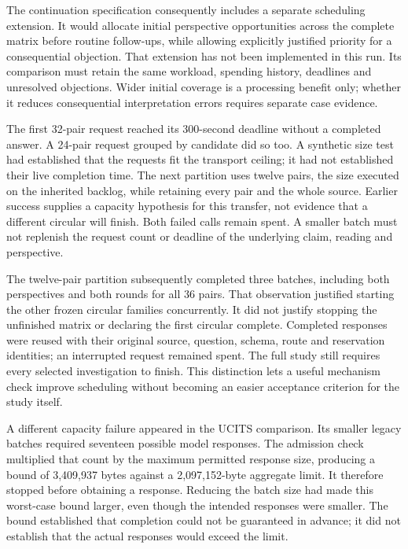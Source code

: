 \documentclass[12pt,a4paper,oneside,openany]{book}
\begin{document}
The continuation specification consequently includes a separate scheduling
extension. It would allocate initial perspective opportunities across the
complete matrix before routine follow-ups, while allowing explicitly justified
priority for a consequential objection. That extension has not been implemented
in this run. Its comparison must retain the same workload, spending history,
deadlines and unresolved objections. Wider initial coverage is a processing
benefit only; whether it reduces consequential interpretation errors requires
separate case evidence.

The first 32-pair request reached its 300-second deadline without a completed
answer. A 24-pair request grouped by candidate did so too. A synthetic size test
had established that the requests fit the transport ceiling; it had not
established their live completion time. The next partition uses twelve pairs,
the size executed on the inherited backlog, while retaining every pair and the
whole source. Earlier success supplies a capacity hypothesis for this transfer,
not evidence that a different circular will finish. Both failed calls remain
spent. A smaller batch must not replenish the request count or deadline of the
underlying claim, reading and perspective.

The twelve-pair partition subsequently completed three batches, including both
perspectives and both rounds for all 36 pairs. That observation justified
starting the other frozen circular families concurrently. It did not justify
stopping the unfinished matrix or declaring the first circular complete.
Completed responses were reused with their original source, question, schema,
route and reservation identities; an interrupted request remained spent.
The full study still requires every selected investigation to finish. This
distinction lets a useful mechanism check improve scheduling without becoming
an easier acceptance criterion for the study itself.

A different capacity failure appeared in the UCITS comparison. Its smaller
legacy batches required seventeen possible model responses. The admission
check multiplied that count by the maximum permitted response size, producing
a bound of 3,409,937 bytes against a 2,097,152-byte aggregate limit. It therefore
stopped before obtaining a response. Reducing the batch size had made this
worst-case bound larger, even though the intended responses were smaller.
The bound established that completion could not be guaranteed in advance; it
did not establish that the actual responses would exceed the limit.
\end{document}
